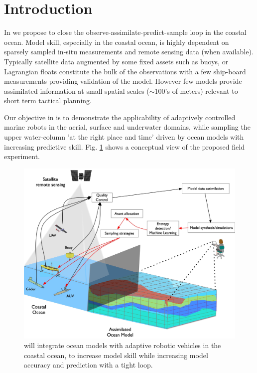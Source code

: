 \section*{Introduction}

In \proj we propose to close the observe-assimilate-predict-sample
loop in the coastal ocean. Model skill, especially in the coastal
ocean, is highly dependent on sparsely sampled in-situ measurements
and remote sensing data (when available).  Typically satellite data
augmented by some fixed assets such as buoys, or Lagrangian floats
constitute the bulk of the observations with a few ship-board
measurements providing validation of the model. However few models
provide assimilated information at small spatial scales ($\sim 100$'s
of meters) relevant to short term tactical planning.


Our objective in \proj is to demonstrate the applicability of
adaptively controlled marine robots in the aerial, surface and
underwater domains, while sampling the upper water-column 'at the
right place and time' driven by ocean models with increasing
predictive skill. Fig. \ref{fig:block-diag} shows a conceptual view of
the proposed field experiment.

\begin{figure}[!b]
  \centering
  \includegraphics[scale=0.15]{fig/ensemble.jpg}
  \caption{\proj will integrate ocean models with adaptive robotic vehicles
    in the coastal ocean, to increase model skill while increasing
    model accuracy and prediction with a tight loop.}
  \label{fig:block-diag}
\end{figure}

